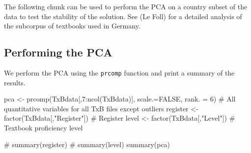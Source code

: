 \documentclass[
  letterpaper,
  DIV=11,
  numbers=noendperiod]{scrreprt}
\newenvironment{Shaded}{\begin{snugshade}}{\end{snugshade}}
\newcommand{\AttributeTok}[1]{\textcolor[rgb]{0.40,0.45,0.13}{#1}}
\newcommand{\CommentTok}[1]{\textcolor[rgb]{0.37,0.37,0.37}{#1}}
\newcommand{\ConstantTok}[1]{\textcolor[rgb]{0.56,0.35,0.01}{#1}}
\newcommand{\DecValTok}[1]{\textcolor[rgb]{0.68,0.00,0.00}{#1}}
\newcommand{\FunctionTok}[1]{\textcolor[rgb]{0.28,0.35,0.67}{#1}}
\newcommand{\NormalTok}[1]{\textcolor[rgb]{0.00,0.23,0.31}{#1}}
\newcommand{\OtherTok}[1]{\textcolor[rgb]{0.00,0.23,0.31}{#1}}
\newcommand{\SpecialCharTok}[1]{\textcolor[rgb]{0.37,0.37,0.37}{#1}}
\newcommand{\StringTok}[1]{\textcolor[rgb]{0.13,0.47,0.30}{#1}}
\begin{document}
The following chunk can be used to perform the PCA on a country subset
of the data to test the stability of the solution. See (Le Foll) for a
detailed analysis of the subcorpus of textbooks used in Germany.

\begin{Shaded}
\end{Shaded}

\subsection{Performing the PCA}\label{performing-the-pca}

We perform the PCA using the \texttt{prcomp} function and print a
summary of the results.

\begin{Shaded}
\begin{Highlighting}[]
\NormalTok{pca }\OtherTok{\textless{}{-}} \FunctionTok{prcomp}\NormalTok{(TxBdata[,}\DecValTok{7}\SpecialCharTok{:}\FunctionTok{ncol}\NormalTok{(TxBdata)], }\AttributeTok{scale.=}\ConstantTok{FALSE}\NormalTok{, }\AttributeTok{rank. =} \DecValTok{6}\NormalTok{) }\CommentTok{\# All quantitative variables for all TxB files except outliers}
\NormalTok{register  }\OtherTok{\textless{}{-}} \FunctionTok{factor}\NormalTok{(TxBdata[,}\StringTok{"Register"}\NormalTok{]) }\CommentTok{\# Register}
\NormalTok{level }\OtherTok{\textless{}{-}} \FunctionTok{factor}\NormalTok{(TxBdata[,}\StringTok{"Level"}\NormalTok{]) }\CommentTok{\# Textbook proficiency level}

\CommentTok{\# summary(register)}
\CommentTok{\# summary(level)}
\FunctionTok{summary}\NormalTok{(pca)}
\end{Highlighting}
\end{Shaded}
\end{document}

